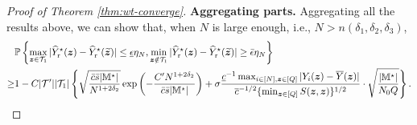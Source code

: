 \documentclass[12pt]{article}
\begin{document}
\begin{proof}[Proof of Theorem \ref{thm:wt-converge}]
\textbf{Aggregating parts.} Aggregating all the results above, we can show that, when $N$ is large enough, i.e., $N>n(\delta_1,\delta_2,\delta_3)$,
\begin{align}
     &{\mathbb{P}}\left\{\max_{{\boldsymbol{z}}\in{\mathcal{T}}_{1}}|{\widehat{Y}}^\star_{\operatorname{r}}({\boldsymbol{z}}) - {\widehat{Y}}^\star_{\operatorname{r}}(\widetilde{{\boldsymbol{z}}})|\le \underline{\epsilon}\eta_N, \min_{{\boldsymbol{z}}\notin{\mathcal{T}}_{1}}|{\widehat{Y}}^\star_{\operatorname{r}}({\boldsymbol{z}}) - {\widehat{Y}}^\star_{\operatorname{r}}(\widetilde{{\boldsymbol{z}}})|\ge \bar{\epsilon}\eta_N \right\} \notag\\
     \ge & 1 -  C|{\mathcal{T}}'||{\mathcal{T}}_{1}|\left\{\sqrt{\frac{\bar{c}\bar{s}|{\mathbb{M}}^\star|}{N^{1+2\delta_2}}}\exp\left(-\frac{C'N^{1+2\delta_2}}{\bar{c}\bar{s}|{\mathbb{M}}^\star|}\right)+\sigma   \frac{ \underline{c}^{-1} \max_{i\in[N],{\boldsymbol{z}}\in[Q]}|Y_i({\boldsymbol{z}})-\overline{Y}({\boldsymbol{z}})|}{ {\overline{c}^{-1/2} \{\min_{{\boldsymbol{z}}\in[Q]} S({\boldsymbol{z}},{\boldsymbol{z}})}\}^{1/2}}\cdot \sqrt{\frac{|{\mathbb{M}}^\star|}{N_0Q}}\right\}. \label{eqn:key-bound}
\end{align}

   


\end{proof}
\end{document}
